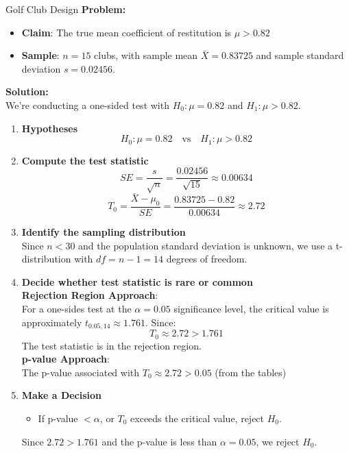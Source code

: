 \documentclass[10pt]{extarticle}
\begin{document}
\begin{examplebox}{Golf Club Design}{}
    \textbf{Problem:}
    \begin{itemize}
        \item \textbf{Claim}: The true mean coefficient of restitution is $\mu > 0.82$
        \item \textbf{Sample}: $n = 15$ clubs, with sample mean $\bar{X} = 0.83725$ and sample standard deviation $s = 0.02456$.
    \end{itemize}
    \textbf{Solution:}\\
    We're conducting a one-sided test with $H_0: \mu = 0.82$ and $H_1: \mu > 0.82$.
    \begin{enumerate}
        \item \textbf{Hypotheses}
              $$H_0: \mu = 0.82 \quad \text{vs} \quad H_1: \mu > 0.82$$
        \item \textbf{Compute the test statistic}
              $$SE = \frac{s}{\sqrt{n}} = \frac{0.02456}{\sqrt{15}} \approx 0.00634$$
              $$T_0 = \frac{\bar{X} - \mu_0}{SE} = \frac{0.83725 - 0.82}{0.00634} \approx 2.72$$
        \item \textbf{Identify the sampling distribution}\\[1.5ex]
              Since $n < 30$ and the population standard deviation is unknown, we use a t-distribution with $df = n - 1 = 14$ degrees of freedom.\\[-1.5ex]
        \item \textbf{Decide whether test statistic is rare or common}\\[1.5ex]
              \textbf{Rejection Region Approach}: \\
              For a one-sides test at the $\alpha = 0.05$ significance level, the critical value is approximately $t_{0.05, 14} \approx 1.761$. Since:
              $$T_0 \approx 2.72 > 1.761$$
              The test statistic is in the rejection region. \\[1.5ex]
              \textbf{p-value Approach}:\\
              The p-value associated with $T_0 \approx 2.72 > 0.05$ (from the tables)
        \item \textbf{Make a Decision}
              \begin{itemize}
                  \item If  p-value $< \alpha$, or $T_0$ exceeds the critical value, reject $H_0$.
              \end{itemize}
              Since $2.72 > 1.761$ and the p-value is less than $\alpha = 0.05$, we reject $H_0$.

\end{enumerate}
\end{examplebox}
\end{document}
